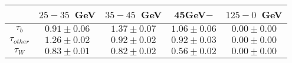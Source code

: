 \begin{table}
\footnotesize
\caption{}
\centering
\begin{tabular}{|c|c|c|c|c|} \hline
 & $25-35$~GeV & $35-45$~GeV & 45GeV$-$ & $125-0$~GeV\\\hline
$\tau_{b}$ & $0.91\pm0.06$ & $1.37\pm0.07$ & $1.06\pm0.06$ & $0.00\pm0.00$\\\hline
$\tau_{other}$ & $1.26\pm0.02$ & $0.92\pm0.02$ & $0.92\pm0.03$ & $0.00\pm0.00$\\\hline
$\tau_{W}$ & $0.83\pm0.01$ & $0.82\pm0.02$ & $0.56\pm0.02$ & $0.00\pm0.00$\\\hline
\end{tabular}
\label{tab:scale_factor}
\end{table}
